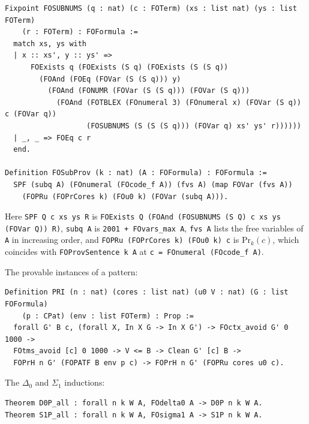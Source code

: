 \documentclass[11pt]{article}
\theoremstyle{plain}
\theoremstyle{definition}
\theoremstyle{remark}
\newcommand{\Prv}{\mathrm{Pr}}
\newcommand{\rocq}[1]{\texttt{#1}}
\begin{document}
\begin{lstlisting}
Fixpoint FOSUBNUMS (q : nat) (c : FOTerm) (xs : list nat) (ys : list FOTerm)
    (r : FOTerm) : FOFormula :=
  match xs, ys with
  | x :: xs', y :: ys' =>
      FOExists q (FOExists (S q) (FOExists (S (S q))
        (FOAnd (FOEq (FOVar (S (S q))) y)
          (FOAnd (FONUMR (FOVar (S (S q))) (FOVar (S q)))
            (FOAnd (FOTBLEX (FOnumeral 3) (FOnumeral x) (FOVar (S q)) c (FOVar q))
                   (FOSUBNUMS (S (S (S q))) (FOVar q) xs' ys' r))))))
  | _, _ => FOEq c r
  end.

Definition FOSubProv (k : nat) (A : FOFormula) : FOFormula :=
  SPF (subq A) (FOnumeral (FOcode_f A)) (fvs A) (map FOVar (fvs A))
    (FOPRu (FOPrCores k) (FOu0 k) (FOVar (subq A))).
\end{lstlisting}
Here \rocq{SPF Q c xs ys R} is
\rocq{FOExists Q (FOAnd (FOSUBNUMS (S Q) c xs ys (FOVar Q)) R)},
\rocq{subq A} is \rocq{2001 + FOvars\_max A}, \rocq{fvs A} lists the free
variables of \rocq{A} in increasing order, and
\rocq{FOPRu (FOPrCores k) (FOu0 k) c} is $\Prv_k(c)$, which coincides
with \rocq{FOProvSentence k A} at \rocq{c = FOnumeral (FOcode\_f A)}.

The provable instances of a pattern:

\begin{lstlisting}
Definition PRI (n : nat) (cores : list nat) (u0 V : nat) (G : list FOFormula)
    (p : CPat) (env : list FOTerm) : Prop :=
  forall G' B c, (forall X, In X G -> In X G') -> FOctx_avoid G' 0 1000 ->
  FOtms_avoid [c] 0 1000 -> V <= B -> Clean G' [c] B ->
  FOPrH n G' (FOPATF B env p c) -> FOPrH n G' (FOPRu cores u0 c).
\end{lstlisting}

The $\Delta_0$ and $\Sigma_1$ inductions:

\begin{lstlisting}
Theorem D0P_all : forall n k W A, FOdelta0 A -> D0P n k W A.
Theorem S1P_all : forall n k W A, FOsigma1 A -> S1P n k W A.
\end{lstlisting}
\end{document}
